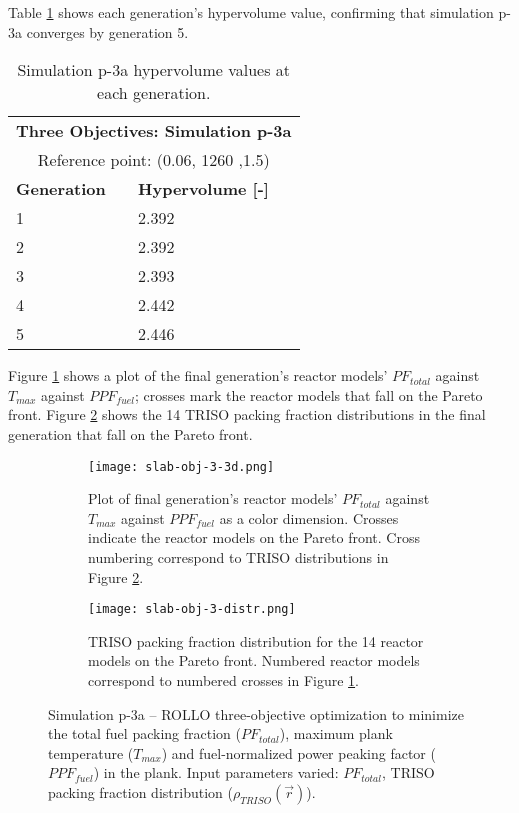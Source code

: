 Table \ref{tab:p3a-hypervolume} shows each generation's hypervolume value, 
confirming that simulation p-3a converges by generation 5. 
\begin{table}[htbp!]
    \centering
    \onehalfspacing
    \caption{Simulation p-3a hypervolume values at each generation.}
	\label{tab:p3a-hypervolume}
    \footnotesize
    \begin{tabular}{ll}
    \hline 
    \multicolumn{2}{c}{\textbf{Three Objectives: Simulation p-3a}} \\
    \multicolumn{2}{c}{Reference point: (0.06, 1260 ,1.5)} \\
    \hline 
    \textbf{Generation} & \textbf{Hypervolume [-]} \\
    \hline
    1 & 2.392 \\
    2 & 2.392 \\
    3 & 2.393 \\
    4 & 2.442 \\
    5 & 2.446 \\
    \hline
    \end{tabular}
\end{table}

Figure \ref{fig:slab-obj-3-3d} shows a plot of the final generation's reactor models' 
$PF_{total}$ against $T_{max}$ against $PPF_{fuel}$; crosses 
mark the reactor models that fall on the Pareto front.
Figure \ref{fig:slab-obj-3-distr} shows the 14 TRISO packing fraction distributions in 
the final generation that fall on the Pareto front. 
\begin{figure}[htbp!]
    \begin{subfigure}{\textwidth}
        \centering
        \texttt{[image: slab-obj-3-3d.png]}
        \caption{Plot of final generation's reactor models' $PF_{total}$ against 
        $T_{max}$ against $PPF_{fuel}$ as a color dimension. 
        Crosses indicate the reactor models on the Pareto front. 
        Cross numbering correspond to TRISO distributions in Figure 
        \ref{fig:slab-obj-3-distr}.}
        \label{fig:slab-obj-3-3d} 
    \end{subfigure}
    \begin{subfigure}{\textwidth}
        \texttt{[image: slab-obj-3-distr.png]}
        \caption{TRISO packing fraction distribution for the 14 reactor models on the 
        Pareto front. Numbered reactor models correspond to numbered crosses in Figure 
        \ref{fig:slab-obj-3-3d}.}
        \label{fig:slab-obj-3-distr} 
    \end{subfigure}
    \caption{Simulation p-3a -- ROLLO three-objective optimization to minimize the total 
    fuel packing fraction ($PF_{total}$), maximum plank temperature ($T_{max}$) and 
    fuel-normalized power peaking factor ($PPF_{fuel}$) in the plank. 
    Input parameters varied: $PF_{total}$, TRISO packing fraction distribution
    ($\rho_{TRISO}(\vec{r})$).}
    \label{fig:slab-obj-3}
\end{figure}

